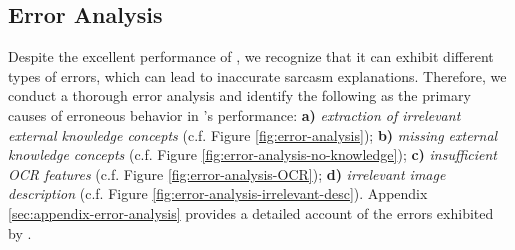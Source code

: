 
\subsection{Error Analysis} \label{sec:error-analysis}
Despite the excellent performance of \model, we recognize that it can exhibit different types of errors, which can lead to inaccurate sarcasm explanations. 
Therefore, we conduct a thorough error analysis and identify the following as the primary causes of erroneous behavior in \model's performance:
\textbf{a)} \textit{extraction of irrelevant external knowledge concepts} (c.f. Figure \ref{fig:error-analysis}); 
\textbf{b)} \textit{missing external knowledge concepts} (c.f. Figure \ref{fig:error-analysis-no-knowledge});
\textbf{c)} \textit{insufficient OCR features} (c.f. Figure \ref{fig:error-analysis-OCR});
\textbf{d)} \textit{irrelevant image description} (c.f. Figure \ref{fig:error-analysis-irrelevant-desc}). Appendix \ref{sec:appendix-error-analysis} provides a detailed account of the errors exhibited by \model.